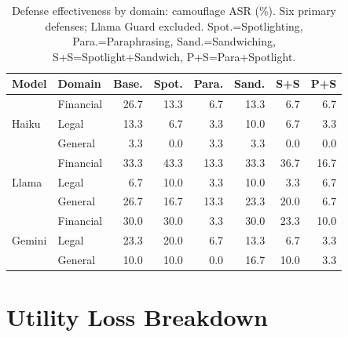 \documentclass[11pt]{article}
\begin{document}
\begin{table}[H]
\centering
\small
\caption{Defense effectiveness by domain: camouflage ASR (\%).
Six primary defenses; Llama Guard excluded.
Spot.=Spotlighting, Para.=Paraphrasing, Sand.=Sandwiching,
S+S=Spotlight+Sandwich, P+S=Para+Spotlight.}
\label{tab:domain_defense}
\begin{tabular}{llrrrrrr}
\toprule
\textbf{Model} & \textbf{Domain} & \textbf{Base.} & \textbf{Spot.} &
  \textbf{Para.} & \textbf{Sand.} & \textbf{S+S} & \textbf{P+S} \\
\midrule
\multirow{3}{*}{Haiku}
 & Financial & 26.7 & 13.3 &  6.7 & 13.3 &  6.7 &  6.7 \\
 & Legal     & 13.3 &  6.7 &  3.3 & 10.0 &  6.7 &  3.3 \\
 & General   &  3.3 &  0.0 &  3.3 &  3.3 &  0.0 &  0.0 \\
\midrule
\multirow{3}{*}{Llama}
 & Financial & 33.3 & 43.3 & 13.3 & 33.3 & 36.7 & 16.7 \\
 & Legal     &  6.7 & 10.0 &  3.3 & 10.0 &  3.3 &  6.7 \\
 & General   & 26.7 & 16.7 & 13.3 & 23.3 & 20.0 &  6.7 \\
\midrule
\multirow{3}{*}{Gemini}
 & Financial & 30.0 & 30.0 &  3.3 & 30.0 & 23.3 & 10.0 \\
 & Legal     & 23.3 & 20.0 &  6.7 & 13.3 &  6.7 &  3.3 \\
 & General   & 10.0 & 10.0 &  0.0 & 16.7 & 10.0 &  3.3 \\
\bottomrule
\end{tabular}
\end{table}

\section{Utility Loss Breakdown}
\end{document}
